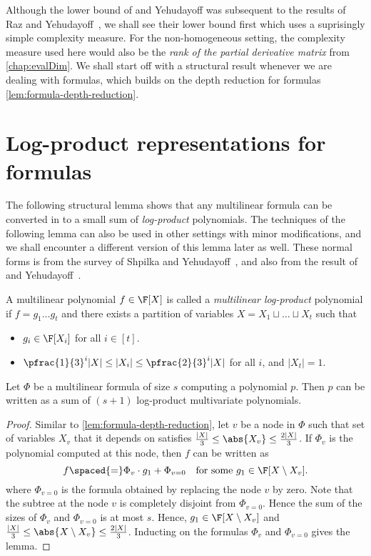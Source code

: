 Although the lower bound of \Hrubes and Yehudayoff was subsequent to the results of Raz and Yehudayoff~\cite{raz2004,raz-yehudayoff}, we shall see their lower bound first which uses a suprisingly simple complexity measure. For the non-homogeneous setting, the complexity measure used here would also be the \emph{rank of the partial derivative matrix} from \autoref{chap:evalDim}. We shall start off with a structural result whenever we are dealing with formulas, which builds on the depth reduction for formulas \autoref{lem:formula-depth-reduction}. 

\section{Log-product representations for formulas}

The following structural lemma shows that any multilinear formula can be converted in to a small sum of \emph{log-product} polynomials. 
The techniques of the following lemma can also be used in other settings with minor modifications, and we shall encounter a different version of this lemma later as well.
These normal forms is from the survey of Shpilka and Yehudayoff~\cite{sy}, and also from the result of \Hrubes and Yehudayoff~\cite{HY11a}. 

\begin{definition}\label{defn:mult-logproduct}
  A multilinear polynomial $f\in \F[X]$ is called a \emph{multilinear log-product} polynomial if $f = g_1\dots g_t$ and there exists a partition of variables $X = X_1 \sqcup \dots \sqcup X_t$ such that
  \begin{itemize}
  \item $g_i \in \F[X_i]$ for all $i \in [t]$.
  \item $\pfrac{1}{3}^i |X| \leq |X_i| \leq \pfrac{2}{3}^i |X|$ for all
    $i$, and $|X_t| = 1$.
  \end{itemize}
\end{definition}

\begin{lemma}\label{lem:mult-logproduct}
  Let $\Phi$ be a multilinear formula of size $s$ computing a polynomial $p$. 
Then $p$ can be written as a sum of $(s+1)$ log-product multivariate polynomials.
\end{lemma}
\begin{proof}
  Similar to \autoref{lem:formula-depth-reduction}, let $v$ be a node in $\Phi$ such that set of variables $X_v$ that it depends on satisfies $\frac{|X|}{3} \leq \abs{X_v} \leq \frac{2|X|}{3}$. 
If $\Phi_v$ is the polynomial computed at this node, then $f$ can be written as
  $$
  f \spaced{=} \Phi_v \cdot g_1 + \Phi_{v=0} \quad\text{for some $g_1 \in \F[X\setminus X_v]$}.
  $$
  where $\Phi_{v=0}$ is the formula obtained by replacing the node $v$ by zero. 
Note that the subtree at the node $v$ is completely disjoint from $\Phi_{v=0}$. 
Hence the sum of the sizes of $\Phi_v$ and $\Phi_{v=0}$ is at most $s$. 
Hence, $g_1 \in \F[X\setminus X_v]$ and $\frac{|X|}{3} \leq \abs{X \setminus X_v} \leq \frac{2|X|}{3}$. 
Inducting on the formulas $\Phi_v$ and $\Phi_{v=0}$ gives the lemma.
\end{proof}

